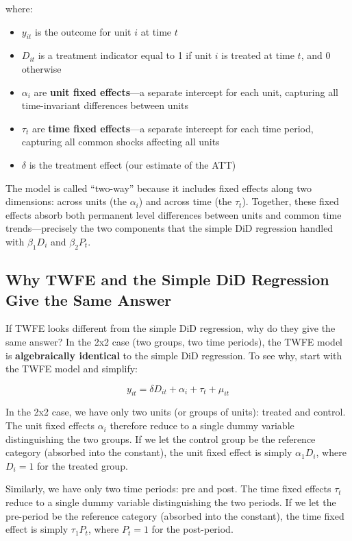 \documentclass[
  letterpaper,
  DIV=11,
  numbers=noendperiod]{scrreprt}
\providecommand{\tightlist}{%
  \setlength{\itemsep}{0pt}\setlength{\parskip}{0pt}}
\begin{document}
where:

\begin{itemize}
\tightlist
\item
  \(y_{it}\) is the outcome for unit \(i\) at time \(t\)
\item
  \(D_{it}\) is a treatment indicator equal to 1 if unit \(i\) is
  treated at time \(t\), and 0 otherwise
\item
  \(\alpha_i\) are \textbf{unit fixed effects}---a separate intercept
  for each unit, capturing all time-invariant differences between units
\item
  \(\tau_t\) are \textbf{time fixed effects}---a separate intercept for
  each time period, capturing all common shocks affecting all units
\item
  \(\delta\) is the treatment effect (our estimate of the ATT)
\end{itemize}

The model is called ``two-way'' because it includes fixed effects along
two dimensions: across units (the \(\alpha_i\)) and across time (the
\(\tau_t\)). Together, these fixed effects absorb both permanent level
differences between units and common time trends---precisely the two
components that the simple DiD regression handled with \(\beta_1 D_i\)
and \(\beta_2 P_t\).

\subsection{Why TWFE and the Simple DiD Regression Give the Same
Answer}\label{why-twfe-and-the-simple-did-regression-give-the-same-answer}

If TWFE looks different from the simple DiD regression, why do they give
the same answer? In the 2x2 case (two groups, two time periods), the
TWFE model is \textbf{algebraically identical} to the simple DiD
regression. To see why, start with the TWFE model and simplify:

\[
y_{it} = \delta D_{it} + \alpha_i + \tau_t + \mu_{it}
\]

In the 2x2 case, we have only two units (or groups of units): treated
and control. The unit fixed effects \(\alpha_i\) therefore reduce to a
single dummy variable distinguishing the two groups. If we let the
control group be the reference category (absorbed into the constant),
the unit fixed effect is simply \(\alpha_1 D_i\), where \(D_i = 1\) for
the treated group.

Similarly, we have only two time periods: pre and post. The time fixed
effects \(\tau_t\) reduce to a single dummy variable distinguishing the
two periods. If we let the pre-period be the reference category
(absorbed into the constant), the time fixed effect is simply
\(\tau_1 P_t\), where \(P_t = 1\) for the post-period.
\end{document}
